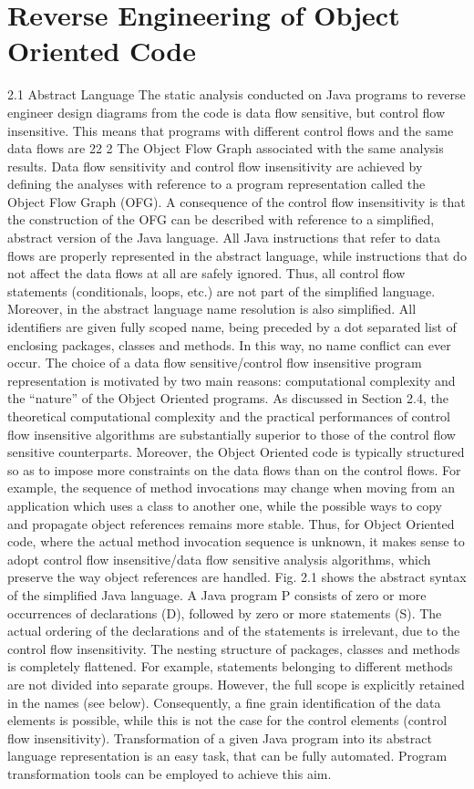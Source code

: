 \documentclass[12pt,a4paper]{article}
\begin{document}
\section{Reverse Engineering of Object Oriented Code}
\textcite{tonella2007reverse}
2.1 Abstract Language
The static analysis conducted on Java programs to reverse engineer design
diagrams from the code is data flow sensitive, but control flow insensitive. This
means that programs with different control flows and the same data flows are
22 2 The Object Flow Graph
associated with the same analysis results. Data flow sensitivity and control
flow insensitivity are achieved by defining the analyses with reference to a
program representation called the Object Flow Graph (OFG). A consequence
of the control flow insensitivity is that the construction of the OFG can be
described with reference to a simplified, abstract version of the Java language.
All Java instructions that refer to data flows are properly represented in the
abstract language, while instructions that do not affect the data flows at all are
safely ignored. Thus, all control flow statements (conditionals, loops, etc.) are
not part of the simplified language. Moreover, in the abstract language name
resolution is also simplified. All identifiers are given fully scoped name, being
preceded by a dot separated list of enclosing packages, classes and methods.
In this way, no name conflict can ever occur.
The choice of a data flow sensitive/control flow insensitive program representation is motivated by two main reasons: computational complexity and
the “nature” of the Object Oriented programs. As discussed in Section 2.4,
the theoretical computational complexity and the practical performances of
control flow insensitive algorithms are substantially superior to those of the
control flow sensitive counterparts. Moreover, the Object Oriented code is
typically structured so as to impose more constraints on the data flows than
on the control flows. For example, the sequence of method invocations may
change when moving from an application which uses a class to another one,
while the possible ways to copy and propagate object references remains more
stable. Thus, for Object Oriented code, where the actual method invocation
sequence is unknown, it makes sense to adopt control flow insensitive/data
flow sensitive analysis algorithms, which preserve the way object references
are handled.
Fig. 2.1 shows the abstract syntax of the simplified Java language. A Java
program P consists of zero or more occurrences of declarations (D), followed
by zero or more statements (S). The actual ordering of the declarations and of
the statements is irrelevant, due to the control flow insensitivity. The nesting
structure of packages, classes and methods is completely flattened. For example, statements belonging to different methods are not divided into separate
groups. However, the full scope is explicitly retained in the names (see below).
Consequently, a fine grain identification of the data elements is possible, while
this is not the case for the control elements (control flow insensitivity).
Transformation of a given Java program into its abstract language representation is an easy task, that can be fully automated. Program transformation tools can be employed to achieve this aim.
\end{document}
